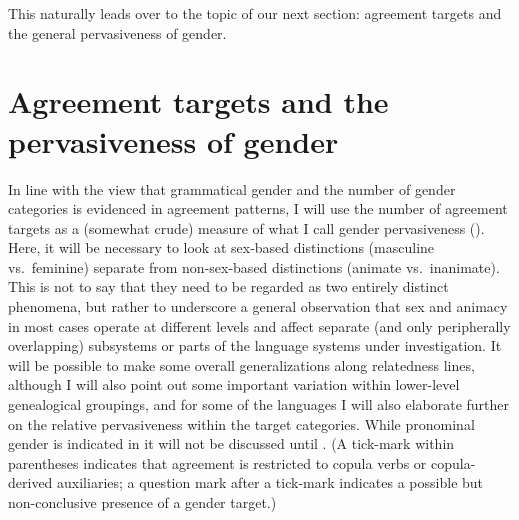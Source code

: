 \documentclass[output=collectionpaper]{langsci/langscibook}
\begin{document}
This naturally leads over to the topic of our next section: agreement targets and the general pervasiveness of gender.

\section{Agreement targets and the pervasiveness of gender}

In line with the view that grammatical gender and the number of gender categories is evidenced in agreement patterns, I will use the number of agreement targets as a (somewhat crude) measure of what I call gender pervasiveness (). Here, it will be necessary to look at sex-based distinctions (masculine vs.\ feminine) separate from non-sex-based distinctions (animate vs.\ inanimate). This is not to say that they need to be regarded as two entirely distinct phenomena, but rather to underscore a general observation that sex and animacy in most cases operate at different levels and affect separate (and only peripherally overlapping) subsystems or parts of the language systems under investigation. It will be possible to make some overall generalizations along relatedness lines, although I will also point out some important variation within lower-level genealogical groupings, and for some of the languages I will also elaborate further on the relative pervasiveness within the target categories. While pronominal gender is indicated in  it will not be discussed until . (A tick-mark within parentheses indicates that agreement is restricted to copula verbs or copula-derived auxiliaries; a question mark after a tick-mark indicates a possible but non-conclusive presence of a gender target.)
\end{document}
